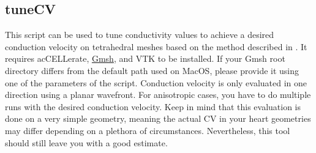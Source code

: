\subsection{tuneCV}
\label{tools:tuneCV}

This script can be used to tune conductivity values to achieve a desired conduction velocity on tetrahedral meshes based on the method described in \cite{costa2013automatic}.
It requires acCELLerate, \href{https://gmsh.info}{Gmsh}, and VTK to be installed.
If your Gmsh root directory differs from the default path used on MacOS, please provide it using one of the parameters of the script.
Conduction velocity is only evaluated in one direction using a planar wavefront.
For anisotropic cases, you have to do multiple runs with the desired conduction velocity.
Keep in mind that this evaluation is done on a very simple geometry, meaning the actual CV in your heart geometries may differ depending on a plethora of circumstances.
Nevertheless, this tool should still leave you with a good estimate.

